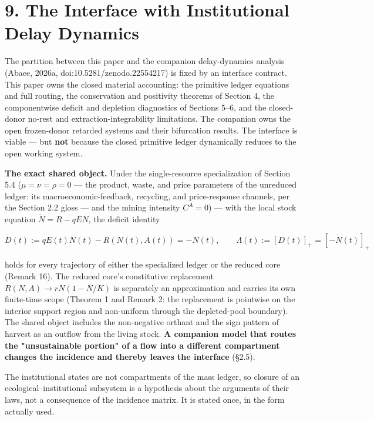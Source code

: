 \documentclass[11pt]{article}
\begin{document}
\vspace{0.8em}

\section*{9. The Interface with Institutional Delay Dynamics}\label{9-the-interface-with-institutional-delay-dynamics}

The partition between this paper and the companion delay-dynamics analysis (Abaee, 2026a, doi:10.5281/\allowbreak{}zenodo.22554217) is fixed by an interface contract. This paper owns the closed material accounting: the primitive ledger equations and full routing, the conservation and positivity theorems of Section 4, the componentwise deficit and depletion diagnostics of Sections 5--6, and the closed-donor no-rest and extraction-integrability limitations. The companion owns the open frozen-donor retarded systems and their bifurcation results. The interface is viable --- but \textbf{not} because the closed primitive ledger dynamically reduces to the open working system.

\textbf{The exact shared object.} Under the single-resource specialization of Section 5.4 (\(\mu = \nu = \rho = 0\) --- the product, waste, and price parameters of the unreduced ledger: its macroeconomic-feedback, recycling, and price-response channels, per the Section 2.2 gloss --- and the mining intensity \(C^A = 0\)) --- with the local stock equation \(\dot N = R - qEN\), the deficit identity 

$$D(t) := qE(t)N(t) - R(N(t), A(t)) = -\dot N(t), \qquad \Lambda(t) := [D(t)]_+ = [-\dot N(t)]_+$$

 holds for every trajectory of either the specialized ledger or the reduced core (Remark 16). The reduced core's constitutive replacement \(R(N,\allowbreak{}A)\to rN(1-N/\allowbreak{}K)\) is separately an approximation and carries its own finite-time scope (Theorem 1 and Remark 2: the replacement is pointwise on the interior support region and non-uniform through the depleted-pool boundary). The shared object includes the non-negative orthant and the sign pattern of harvest as an outflow from the living stock. \textbf{A companion model that routes the "unsustainable portion" of a flow into a different compartment changes the incidence and thereby leaves the interface} (\S2.5).

The institutional states are not compartments of the mass ledger, so closure of an ecological--institutional subsystem is a hypothesis about the arguments of their laws, not a consequence of the incidence matrix. It is stated once, in the form actually used.
\end{document}
